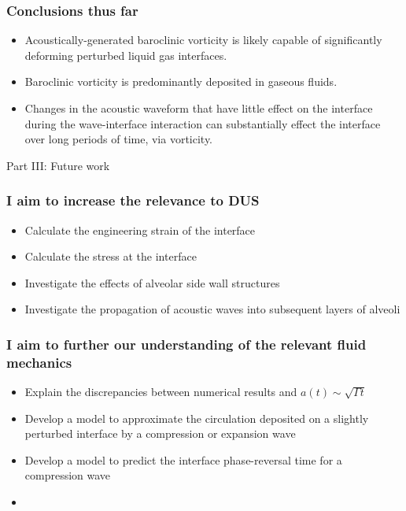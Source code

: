 \begin{frame} \frametitle{Conclusions thus far}
  \begin{itemize}
  \item Acoustically-generated baroclinic vorticity is likely capable
    of significantly deforming perturbed liquid gas interfaces.
  \item Baroclinic vorticity is predominantly deposited in gaseous fluids.
  \item Changes in the acoustic waveform that have little effect on
    the interface during the wave-interface interaction can
    substantially effect the interface over long periods of time, via
    vorticity.
  \end{itemize}
\end{frame}
\begin{frame}
  \centering
  \begin{center}
    \LARGE Part III: Future work
  \end{center}
\end{frame}
\begin{frame}\frametitle{I aim to increase the relevance to DUS}
  \begin{itemize}
  \item Calculate the engineering strain of the interface
  \item Calculate the stress at the interface
  \item Investigate the effects of alveolar side wall structures
  \item Investigate the propagation of acoustic waves into subsequent layers of alveoli
  \end{itemize}
\end{frame}
\begin{frame}\frametitle{I aim to further our understanding of the relevant fluid mechanics}
  \begin{itemize}
  \item Explain the discrepancies between numerical results and $a(t)\sim\sqrt{\Gamma t}$
  \item Develop a model to approximate the circulation deposited on a
    slightly perturbed interface by a compression or expansion wave
  \item Develop a model to predict the interface phase-reversal time for a compression wave
  \item 
  \end{itemize}
\end{frame}


